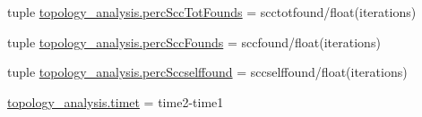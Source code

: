 \begin{DoxyCompactItemize}
\item 
tuple \hyperlink{a00159_aee49954a6b9abb7c4bd677c17ed4013b}{topology\+\_\+analysis.\+perc\+Scc\+Tot\+Founds} = scctotfound/float(iterations)
\item 
tuple \hyperlink{a00159_a14f23c89de77042b80e78e1d9ab7b754}{topology\+\_\+analysis.\+perc\+Scc\+Founds} = sccfound/float(iterations)
\item 
tuple \hyperlink{a00159_a8bf55c62b8e7385526396a9003e343bb}{topology\+\_\+analysis.\+perc\+Sccselffound} = sccselffound/float(iterations)
\item 
\hyperlink{a00159_a5b12bbbc66679be171ab082dbaeba90b}{topology\+\_\+analysis.\+timet} = time2-\/time1
\end{DoxyCompactItemize}
